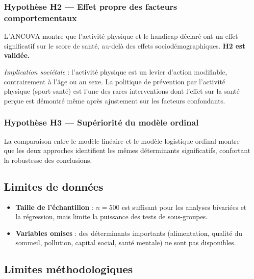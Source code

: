 \documentclass[11pt,a4paper]{memoirerecherche}
\providecommand{\tightlist}{%
  \setlength{\itemsep}{0pt}\setlength{\parskip}{0pt}}
\begin{document}
\hypertarget{hypothuxe8se-h2-effet-propre-des-facteurs-comportementaux}{%
\subsubsection{Hypothèse H2 --- Effet propre des facteurs comportementaux}\label{hypothuxe8se-h2-effet-propre-des-facteurs-comportementaux}}

L'ANCOVA montre que l'activité physique et le handicap déclaré ont un effet significatif sur le score de santé, au-delà des effets sociodémographiques. \textbf{H2 est validée.}

\emph{Implication sociétale} : l'activité physique est un levier d'action modifiable, contrairement à l'âge ou au sexe. La politique de prévention par l'activité physique (sport-santé) est l'une des rares interventions dont l'effet sur la santé perçue est démontré même après ajustement sur les facteurs confondants.

\hypertarget{hypothuxe8se-h3-supuxe9riorituxe9-du-moduxe8le-ordinal}{%
\subsubsection{Hypothèse H3 --- Supériorité du modèle ordinal}\label{hypothuxe8se-h3-supuxe9riorituxe9-du-moduxe8le-ordinal}}

La comparaison entre le modèle linéaire et le modèle logistique ordinal montre que les deux approches identifient les mêmes déterminants significatifs, confortant la robustesse des conclusions.

\hypertarget{limites-de-donnuxe9es}{%
\subsection{Limites de données}\label{limites-de-donnuxe9es}}

\begin{itemize}
\tightlist
\item
  \textbf{Taille de l'échantillon} : \(n = 500\) est suffisant pour les analyses bivariées et la régression, mais limite la puissance des tests de sous-groupes.
\item
  \textbf{Variables omises} : des déterminants importants (alimentation, qualité du sommeil, pollution, capital social, santé mentale) ne sont pas disponibles.
\end{itemize}

\hypertarget{limites-muxe9thodologiques}{%
\subsection{Limites méthodologiques}\label{limites-muxe9thodologiques}}
\end{document}
